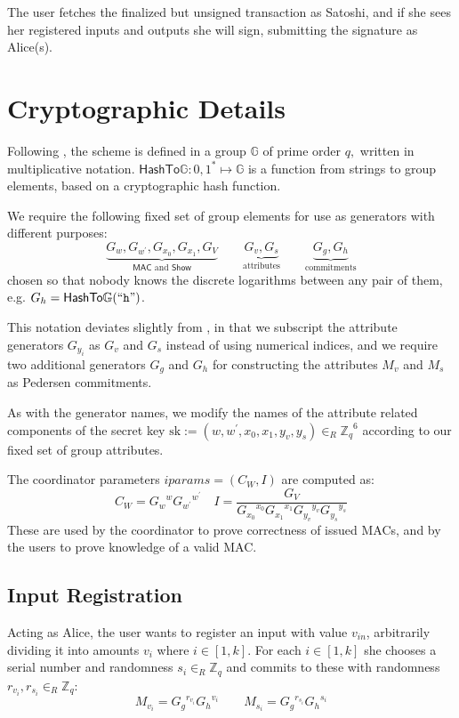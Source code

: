 \documentclass{article}
\begin{document}
The user fetches the finalized but unsigned transaction as Satoshi, and if she sees her registered inputs and outputs she will sign, submitting the signature as Alice(s).

\section{Cryptographic Details}

Following \cite{chase2019signal}, the scheme is defined in a group \(\mathbb{G}\) of prime order \(q,\) written in multiplicative notation. 
$\mathsf{HashTo\mathbb{G}} : {0,1}^* \mapsto \mathbb{G}$ is a function from strings to group elements, based on a cryptographic hash function.

We require the following fixed set of group elements for use as generators with different purposes:
\[
\underbrace{G_{w}, G_{w^{\prime}}, G_{x_{0}}, G_{x_{1}}, G_{V}}_{\mathsf{MAC} \text{~and~} \mathsf{Show}}
\qquad
\underbrace{G_{v}, G_{s}}_{\text{attributes}}
\qquad
\underbrace{G_g, G_h}_{\text{commitments}}
\]
chosen so that nobody knows the discrete logarithms between any pair of them, e.g. $G_h = \mathsf{HashTo\mathbb{G}}(``\texttt{h}")$.

This notation deviates slightly from \cite{chase2019signal}, in that we subscript the attribute generators $G_{y_i}$ as $G_v$ and $G_s$ instead of using numerical indices, and we require two additional generators $G_g$ and $G_h$ for constructing the attributes $M_v$ and $M_s$ as Pedersen commitments.

As with the generator names, we modify the names of the attribute related components of the secret key
$\mathrm{sk} := (w, w^{\prime}, x_{0}, x_{1}, y_{v}, y_{s}) \in_R {\mathbb{Z}_q}^6$
according to our fixed set of group attributes.

The coordinator parameters
$\mathit{iparams} =  (C_{W}, I)$
are computed as:
\[
C_{W}={G_w}^{w} {G_{w^\prime}}^{w^\prime}
\quad
I=\frac{G_{V}}{{G_{x_0}}^{x_0} {G_{x_1}}^{x_1} {G_{y_v}}^{y_v} {G_{y_s}}^{y_s}}
\]
These are used by the coordinator to prove correctness of issued MACs, and by the users to prove knowledge of a valid MAC.

\subsection{Input Registration}

Acting as Alice, the user wants to register an input with value $v_{\mathit{in}}$, arbitrarily dividing it into amounts $v_i$ where $i \in \left[1,k\right]$. For each $i \in [1, k]$ she chooses a serial number and randomness $s_i \in_R \mathbb{Z}_q$ and commits to these with randomness $r_{v_i}, r_{s_i} \in_R \mathbb{Z}_q$:
\[ M_{v_i}={G_g}^{r_{v_i}}{G_h}^{v_i} \qquad M_{s_i}={G_g}^{r_{s_i}}{G_h}^{s_i} \]
\end{document}
